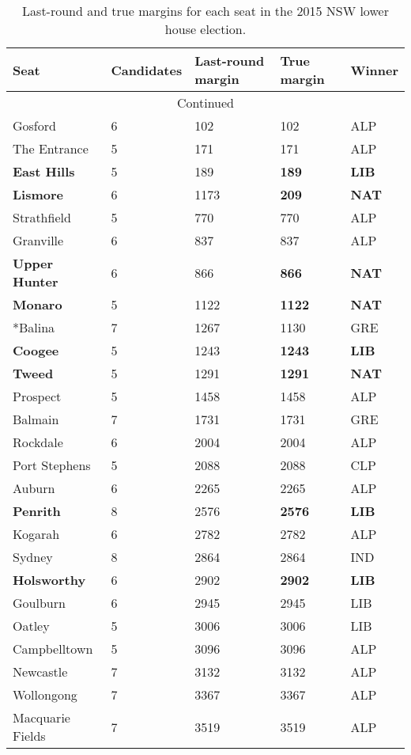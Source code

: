 \documentclass{article}
\begin{document}
\begin{center}
\begin{longtable}{lllll}
\caption{Last-round and true margins for each seat in the 2015 NSW lower house election.}
\label{tab:NSWmargins}\tabularnewline
\hline
Seat &  Candidates & Last-round margin & True margin & Winner \\
\hline
\endhead
\hline
\multicolumn{5}{c}{Continued}\\
\endfoot
\endlastfoot
Gosford & 6 & 102 & 102 & ALP \\
The Entrance & 5 & 171 & 171 & ALP \\
{\bf East Hills} & 5 & 189 & {\bf 189 } & {\bf LIB }\\
{\bf *Lismore} & 6 & 1173 & {\bf 209 } &{\bf NAT} \\
Strathfield & 5 & 770 & 770 & ALP \\
Granville & 6 & 837 & 837 & ALP \\
{\bf Upper Hunter} & 6 & 866 &  {\bf 866} & {\bf NAT} \\
{\bf Monaro } & 5 & 1122 & {\bf 1122} & {\bf NAT} \\
*Balina & 7 & 1267 & 1130 & GRE \\
{\bf Coogee} & 5 & 1243 & {\bf 1243} & {\bf LIB} \\
{\bf Tweed} & 5 & 1291 & {\bf 1291} & {\bf NAT} \\
Prospect & 5 & 1458 & 1458 & ALP \\
Balmain & 7 & 1731 & 1731 & GRE \\
Rockdale & 6 & 2004 & 2004 & ALP \\
Port Stephens & 5 & 2088 & 2088 & CLP \\
Auburn & 6 & 2265 & 2265 & ALP \\
{\bf Penrith} & 8 & 2576 & {\bf 2576} & {\bf LIB} \\
Kogarah & 6 & 2782 & 2782 & ALP \\
Sydney & 8 & 2864 & 2864 & IND \\
{\bf Holsworthy} & 6 & 2902 & {\bf 2902} & {\bf LIB} \\
Goulburn & 6 & 2945 & 2945 & LIB \\
Oatley & 5 & 3006 & 3006 & LIB \\
Campbelltown & 5 & 3096 & 3096 & ALP \\
Newcastle & 7 & 3132 & 3132 & ALP \\
Wollongong & 7 & 3367 & 3367 & ALP \\
Macquarie Fields & 7 & 3519 & 3519 & ALP \\

\end{longtable}
\end{center}
\end{document}
